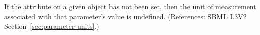 If the attribute  on a given \Parameter object has not been
set, then the unit of measurement associated with that parameter's value is
undefined.  (References: SBML L3V2 Section~\ref{sec:parameter-units}.)

